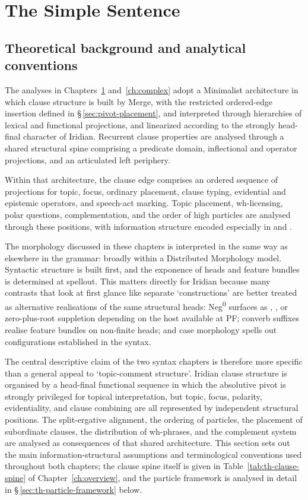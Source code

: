 \chapter{The Simple Sentence}\label{ch:simple}

\section{Theoretical background and analytical conventions}
\label{sec:th-background}

The analyses in Chapters~\ref{ch:simple} and~\ref{ch:complex} adopt a Minimalist
architecture in which clause structure is built by Merge, with the restricted
ordered-edge insertion defined in §\,\ref{sec:pivot-placement}, and interpreted through
hierarchies of lexical and functional projections, and linearized according to
the strongly head-final character of Iridian. Recurrent clause properties are
analysed through a shared structural spine comprising a predicate domain,
inflectional and operator projections, and an articulated left periphery.

Within that architecture, the clause edge comprises an ordered sequence of
projections for topic, focus, ordinary placement, clause typing, evidential
and epistemic operators, and speech-act marking. Topic placement, wh-licensing, polar questions,
complementation, and the order of high particles are analysed through these
positions, with information structure encoded especially in
 and .

The morphology discussed in these chapters is interpreted in the same way as
elsewhere in the grammar: broadly within a Distributed Morphology model.
Syntactic structure is built first, and the exponence of heads and feature
bundles is determined at spellout. This matters directly for Iridian because
many contrasts that look at first glance like separate `constructions' are
better treated as alternative realisations of the same structural heads:
Neg\textsuperscript{0} surfaces as , , or zero-plus-root
suppletion depending on the host available at PF; converb suffixes realise
feature bundles on non-finite heads; and case morphology spells out configurations established in the syntax.

The central descriptive claim of the two syntax chapters is therefore more
specific than a general appeal to `topic-comment structure'. Iridian clause
structure is organised by a head-final functional sequence in which the
absolutive pivot is strongly privileged for topical interpretation, but topic,
focus, polarity, evidentiality, and clause combining are all represented by
independent structural positions. The split-ergative alignment, the ordering of
particles, the placement of subordinate clauses, the distribution of wh-phrases,
and the complement system are analysed as consequences of that shared
architecture. This section sets out the main information-structural
assumptions and terminological conventions used throughout both chapters; the
clause spine itself is given in Table~\ref{tab:th-clause-spine} of
Chapter~\ref{ch:overview}, and the particle framework is analysed in detail in
§\,\ref{sec:th-particle-framework} below.

